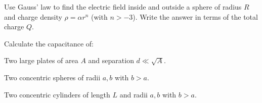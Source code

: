 \documentclass{phys151}
\begin{document}
\begin{solution}

\end{solution}

\begin{problem}
  Use Gauss' law to find the electric field inside and outside a sphere of
  radius \(R\) and charge density \(\rho = \alpha r^n\) (with \(n > -3\)).
  Write the answer in terms of the total charge \(Q\).
\end{problem}

\begin{solution}

\end{solution}

\begin{problem}
  Calculate the capacitance of:
  \begin{subproblems}
  \item Two large plates of area \(A\) and separation \(d \ll \sqrt A\).
  \item Two concentric spheres of radii \(a, b\) with \(b > a\).
  \item Two concentric cylinders of length \(L\) and radii \(a, b\) with \(b >
    a\).
  \end{subproblems}
\end{problem}

\begin{solution}

\end{solution}
\end{document}
